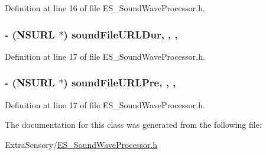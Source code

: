 Definition at line 16 of file E\+S\+\_\+\+Sound\+Wave\+Processor.\+h.

\hypertarget{interface_e_s___sound_wave_processor_a6690d478507657e282ff8cc3d6941502}{
\subsubsection[{sound\+File\+U\+R\+L\+Dur}]{\setlength{\rightskip}{0pt plus 5cm}-\/ (N\+S\+U\+R\+L $\ast$) sound\+File\+U\+R\+L\+Dur\hspace{0.3cm}{\ttfamily [read]}, {\ttfamily [write]}, {\ttfamily [nonatomic]}, {\ttfamily [retain]}}}\label{interface_e_s___sound_wave_processor_a6690d478507657e282ff8cc3d6941502}


Definition at line 17 of file E\+S\+\_\+\+Sound\+Wave\+Processor.\+h.

\hypertarget{interface_e_s___sound_wave_processor_aea7305ff1e749b26cd9af36ab1965610}{
\subsubsection[{sound\+File\+U\+R\+L\+Pre}]{\setlength{\rightskip}{0pt plus 5cm}-\/ (N\+S\+U\+R\+L $\ast$) sound\+File\+U\+R\+L\+Pre\hspace{0.3cm}{\ttfamily [read]}, {\ttfamily [write]}, {\ttfamily [nonatomic]}, {\ttfamily [retain]}}}\label{interface_e_s___sound_wave_processor_aea7305ff1e749b26cd9af36ab1965610}


Definition at line 17 of file E\+S\+\_\+\+Sound\+Wave\+Processor.\+h.



The documentation for this class was generated from the following file\+:\begin{DoxyCompactItemize}
\item 
Extra\+Sensory/\hyperlink{_e_s___sound_wave_processor_8h}{E\+S\+\_\+\+Sound\+Wave\+Processor.\+h}\end{DoxyCompactItemize}
